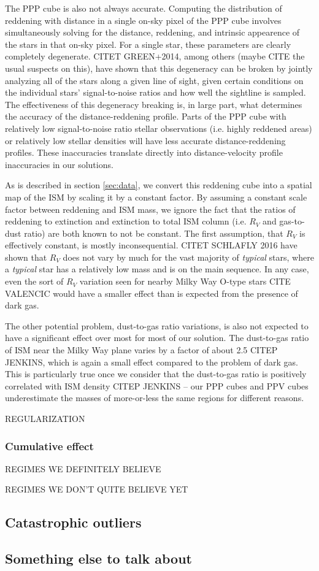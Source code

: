 The PPP cube is also not always accurate. Computing the distribution of reddening with distance in a single on-sky pixel of the PPP cube involves simultaneously solving for the distance, reddening, and intrinsic appearence of the stars in that on-sky pixel. For a single star, these parameters are clearly completely degenerate. CITET GREEN+2014, among others (maybe CITE the usual suspects on this), have shown that this degeneracy can be broken by jointly analyzing all of the stars along a given line of sight, given certain conditions on the individual stars' signal-to-noise ratios and how well the sightline is sampled. The effectiveness of this degeneracy breaking is, in large part, what determines the accuracy of the distance-reddening profile. Parts of the PPP cube with relatively low signal-to-noise ratio stellar observations (i.e. highly reddened areas) or relatively low stellar densities will have less accurate distance-reddening profiles. These inaccuracies translate directly into distance-velocity profile inaccuracies in our solutions. 

As is described in section \ref{sec:data}, we convert this reddening cube into a spatial map of the ISM by scaling it by a constant factor. By assuming a constant scale factor between reddening and ISM mass, we ignore the fact that the ratios of reddening to extinction and extinction to total ISM column (i.e. $R_V$ and gas-to-dust ratio) are both known to not be constant. The first assumption, that $R_V$ is effectively constant, is mostly inconsequential. CITET SCHLAFLY 2016 have shown that $R_V$ does not vary by much for the vast majority of \emph{typical} stars, where a \emph{typical} star has a relatively low mass and is on the main sequence. In any case, even the sort of $R_V$ variation seen for nearby Milky Way O-type stars CITE VALENCIC would have a smaller effect than is expected from the presence of dark gas. 

The other potential problem, dust-to-gas ratio variations, is also not expected to have a significant effect over most for most of our solution. The dust-to-gas ratio of ISM near the Milky Way plane varies by a factor of about 2.5 CITEP JENKINS, which is again a small effect compared to the problem of dark gas. This is particularly true once we consider that the dust-to-gas ratio is positively correlated with ISM density CITEP JENKINS -- our PPP cubes and PPV cubes underestimate the masses of more-or-less the same regions for different reasons. 

REGULARIZATION

\subsubsection{Cumulative effect}
REGIMES WE DEFINITELY BELIEVE

REGIMES WE DON'T QUITE BELIEVE YET

\subsection{Catastrophic outliers}
\label{sec:discussion-catastrophic}

\subsection{Something else to talk about}